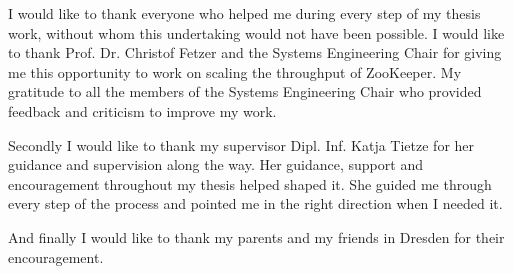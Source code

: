 I would like to thank everyone who helped me during every step of my thesis work, without whom this undertaking would not have been possible. I would like to thank Prof. Dr. Christof Fetzer and the Systems Engineering Chair for giving me this opportunity to work on scaling the throughput of ZooKeeper. My gratitude to all the members of the Systems Engineering Chair who provided feedback and criticism to improve my work.

Secondly I would like to thank my supervisor Dipl. Inf. Katja Tietze for her guidance and supervision along the way. Her guidance, support and encouragement throughout my thesis helped shaped it. She guided me through every step of the process and pointed me in the right direction when I needed it.

And finally I would like to thank my parents and my friends in Dresden for their encouragement.
